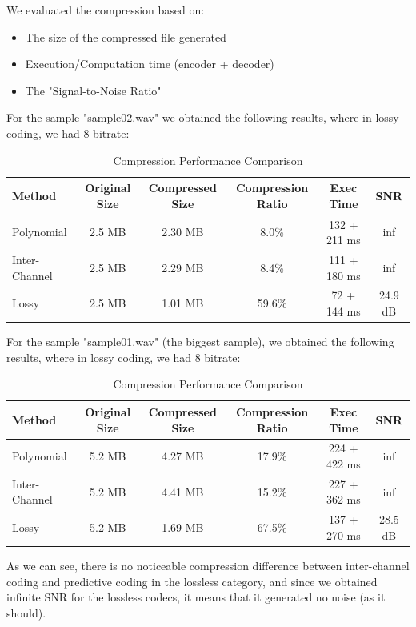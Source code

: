 \documentclass[a4paper,14pt]{article}
\begin{document}
We evaluated the compression based on:
    \begin{itemize}
        \item The size of the compressed file generated
        \item Execution/Computation time (encoder + decoder)
        \item The "Signal-to-Noise Ratio"
    \end{itemize}


For the sample "sample02.wav" we obtained the following results, where in lossy coding, we had 8 bitrate:

\begin{table}[H]
\centering
\begin{tabular}{|l|c|c|c|c|c|}
\hline
\textbf{Method} & \textbf{Original Size} & \textbf{Compressed Size} & \textbf{Compression Ratio} & \textbf{Exec Time} & \textbf{SNR}\\
\hline
Polynomial & 2.5 MB & 2.30 MB & 8.0\% & 132 + 211 ms & inf\\
Inter-Channel & 2.5 MB & 2.29 MB & 8.4\% & 111 + 180 ms & inf\\
Lossy & 2.5 MB & 1.01 MB & 59.6\% & 72 + 144 ms & 24.9 dB\\
\hline
\end{tabular}
\caption{Compression Performance Comparison}
\end{table}

For the sample "sample01.wav" (the biggest sample), we obtained the following results, where in lossy coding, we had 8 bitrate:
\begin{table}[H]
\centering
\begin{tabular}{|l|c|c|c|c|c|}
\hline
\textbf{Method} & \textbf{Original Size} & \textbf{Compressed Size} & \textbf{Compression Ratio} & \textbf{Exec Time} & \textbf{SNR}\\
\hline
Polynomial & 5.2 MB & 4.27 MB & 17.9\% & 224 + 422 ms & inf\\ 
Inter-Channel & 5.2 MB & 4.41 MB & 15.2\% & 227 + 362 ms & inf\\
Lossy & 5.2 MB & 1.69 MB & 67.5\% & 137 + 270 ms & 28.5 dB\\
\hline
\end{tabular}
\caption{Compression Performance Comparison}
\end{table}



As we can see, there is no noticeable compression difference between inter-channel coding and predictive coding in the lossless category, and since we obtained infinite SNR for the lossless codecs, it means that it generated no noise (as it should). 
\end{document}
